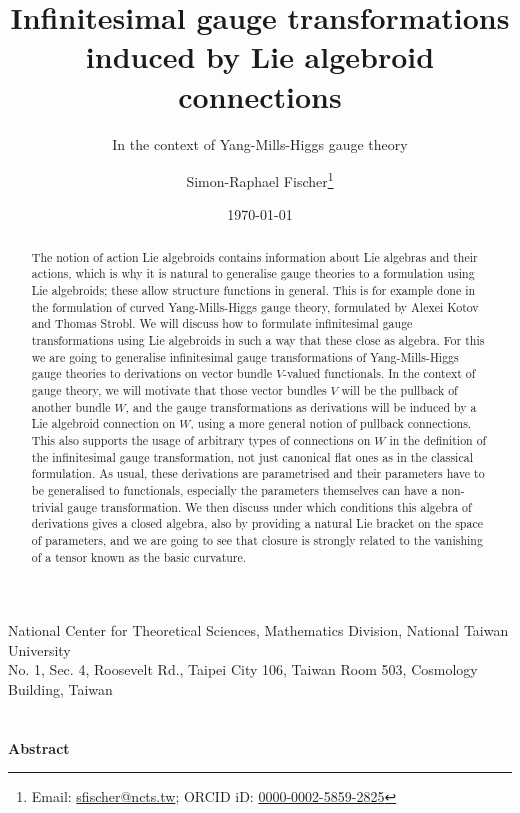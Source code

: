 \documentclass[a4paper,oneside,11pt]{scrartcl} %
\theoremstyle{plain}
\theoremstyle{remark}
\theoremstyle{definition}
\begin{document}
\renewcommand{\thefootnote}{\fnsymbol{footnote}}

\begin{titlepage}

\author{Simon-Raphael Fischer\footnote{Email: \href{mailto:sfischer@ncts.tw}{sfischer@ncts.tw}; ORCID iD: \href{https://orcid.org/0000-0002-5859-2825}{0000-0002-5859-2825}} }
\title{Infinitesimal gauge transformations induced by Lie algebroid connections} 
\subtitle{In the context of Yang-Mills-Higgs gauge theory}
\date{\today} 
\maketitle
\thispagestyle{empty}

\begin{center}
National Center for Theoretical Sciences, Mathematics Division, National Taiwan University\\
No. 1, Sec. 4, Roosevelt Rd., Taipei City 106, Taiwan Room 503, Cosmology Building, Taiwan
\ \\
\ \\
\ \\
\textbf{Abstract}
\begin{abstract}
  \small{The notion of action Lie algebroids contains information about Lie algebras and their actions, which is why it is natural to generalise gauge theories to a formulation using Lie algebroids; these allow structure functions in general. This is for example done in the formulation of curved Yang-Mills-Higgs gauge theory, formulated by Alexei Kotov and Thomas Strobl. We will discuss how to formulate infinitesimal gauge transformations using Lie algebroids in such a way that these close as algebra. For this we are going to generalise infinitesimal gauge transformations of Yang-Mills-Higgs gauge theories to derivations on vector bundle $V$-valued functionals. In the context of gauge theory, we will motivate that those vector bundles $V$ will be the pullback of another bundle $W$, and the gauge transformations as derivations will be induced by a Lie algebroid connection on $W$, using a more general notion of pullback connections. This also supports the usage of arbitrary types of connections on $W$ in the definition of the infinitesimal gauge transformation, not just canonical flat ones as in the classical formulation. As usual, these derivations are parametrised and their parameters have to be generalised to functionals, especially the parameters themselves can have a non-trivial gauge transformation. We then discuss under which conditions this algebra of derivations gives a closed algebra, also by providing a natural Lie bracket on the space of parameters, and we are going to see that closure is strongly related to the vanishing of a tensor known as the basic curvature.
}
\end{abstract}
\end{center}
\end{titlepage}
\end{document}
